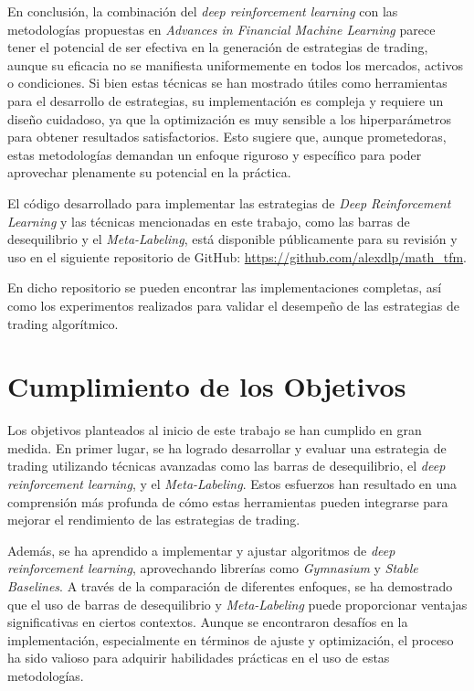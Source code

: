 \documentclass[a4paper,12pt, twoside]{report}
\begin{document}
En conclusión, la combinación del \textit{deep reinforcement learning} con las metodologías 
propuestas en \textit{Advances in Financial Machine Learning} parece tener el potencial 
de ser efectiva en la generación de estrategias de trading, aunque su eficacia no se 
manifiesta uniformemente en todos los mercados, activos o condiciones. Si bien estas 
técnicas se han mostrado útiles como herramientas para el desarrollo de estrategias, 
su implementación es compleja y requiere un diseño cuidadoso, ya que la optimización es 
muy sensible a los hiperparámetros para obtener resultados satisfactorios. Esto sugiere que, 
aunque prometedoras, estas metodologías demandan un enfoque riguroso y específico para 
poder aprovechar plenamente su potencial en la práctica.


El código desarrollado para implementar las estrategias de \textit{Deep Reinforcement Learning} 
y las técnicas mencionadas en este trabajo, como las barras de desequilibrio y el \textit{Meta-Labeling}, 
está disponible públicamente para su revisión y uso en el 
siguiente repositorio de GitHub: \url{https://github.com/alexdlp/math_tfm}. 

En dicho repositorio se pueden encontrar las implementaciones completas, así como los 
experimentos realizados para validar el desempeño de las estrategias de trading algorítmico.


\section{Cumplimiento de los Objetivos}

Los objetivos planteados al inicio de este trabajo se han cumplido en gran medida. En 
primer lugar, se ha logrado desarrollar y evaluar una estrategia de trading utilizando 
técnicas avanzadas como las barras de desequilibrio, el \textit{deep reinforcement learning}, 
y el \textit{Meta-Labeling}. Estos esfuerzos han resultado en una comprensión más profunda 
de cómo estas herramientas pueden integrarse para mejorar el rendimiento de las estrategias 
de trading.

Además, se ha aprendido a implementar y ajustar algoritmos de \textit{deep reinforcement learning}, 
aprovechando librerías como \textit{Gymnasium} y \textit{Stable Baselines}. A través de la 
comparación de diferentes enfoques, se ha demostrado que el uso de barras de desequilibrio 
y \textit{Meta-Labeling} puede proporcionar ventajas significativas en ciertos contextos. 
Aunque se encontraron desafíos en la implementación, especialmente en términos de ajuste 
y optimización, el proceso ha sido valioso para adquirir habilidades prácticas en el 
uso de estas metodologías.
\end{document}
